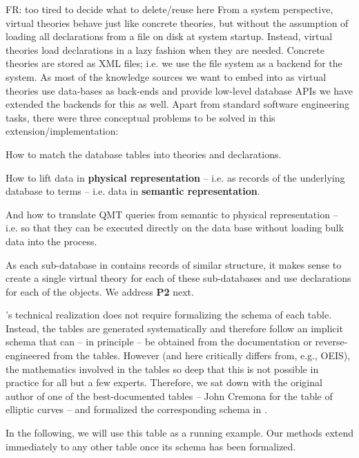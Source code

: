 \begin{oldpart}{FR: too tired to decide what to delete/reuse here}
From a system perspective, virtual theories behave just like concrete theories, but
without the assumption of loading all declarations from a file on disk at system startup.
Instead, virtual theories load declarations in a lazy fashion when they are
needed. Concrete theories are stored as XML files; i.e. we use the file system as a
backend for the \mmt system. As most of the knowledge sources we want to embed into \ommt
as virtual theories use data-bases as back-ends and provide low-level database APIs we
have extended the \mmt backends for this as well. Apart from standard software engineering
tasks, there were three conceptual problems to be solved in this extension/implementation:
\begin{compactenum}[\bf P1]
\item How to match the database tables into \ommt theories and declarations. 
\item How to lift data in \textbf{physical representation} -- i.e. as records of the
  underlying database to \ommt terms -- i.e. data in \textbf{semantic representation}.
\item And how to translate QMT queries from semantic to physical representation -- i.e. so
  that they can be executed directly on the data base without loading bulk data into the
  \mmt process.
\end{compactenum}
 As each sub-database in \lmfdb contains
records of similar structure, it makes sense to create a single virtual theory for each of
these sub-databases and use \ommt declarations for each of the objects. We address
\textbf{P2} next.
\end{oldpart}


\lmfdb's technical realization does not require formalizing the schema of each table.
Instead, the tables are generated systematically and therefore follow an implicit schema that can -- in principle -- be obtained from the documentation or reverse-engineered from the tables.
However (and here \lmfdb critically differs from, e.g., OEIS), the mathematics involved in the tables so deep that this is not possible in practice for all but a few experts.
Therefore, we sat down with the original author of one of the best-documented tables -- John Cremona for the table of elliptic curves -- and formalized the corresponding schema in \ommt.

In the following, we will use this table as a running example.
Our methods extend immediately to any other table once its schema has been formalized.

